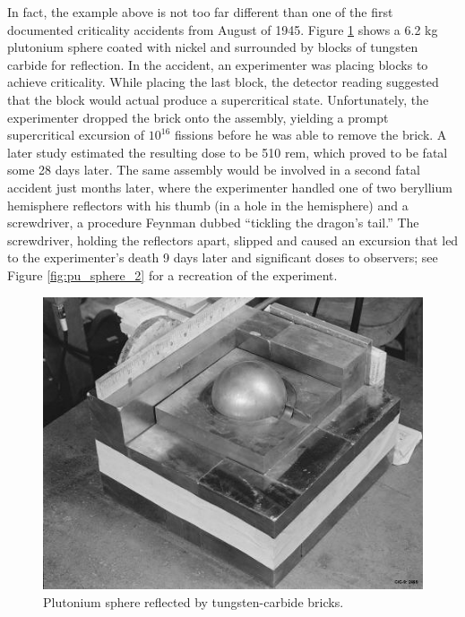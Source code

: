 In fact, the example above is not too far different than one of the first
documented criticality accidents from August of 1945.
Figure \ref{fig:pu_sphere} shows
a 6.2 kg plutonium sphere coated with nickel and surrounded by
blocks of tungsten carbide for reflection.  In the accident, an 
experimenter was placing blocks to achieve criticality.  While
placing the last block, the detector reading suggested that 
the block would actual produce a supercritical state.  Unfortunately,
the experimenter dropped the brick onto the assembly, yielding
a prompt supercritical excursion of $10^{16}$ fissions
before he was able to remove the brick.  A later study estimated
the resulting dose to be 510 rem, which proved to be fatal some
28 days later.  The same assembly would be involved in a second
fatal accident just months later, where the experimenter handled
one of two beryllium hemisphere reflectors
 with his thumb (in a hole in the 
hemisphere) and a screwdriver, a procedure Feynman dubbed
``tickling the dragon's tail.''   The screwdriver, holding the 
reflectors apart, slipped and caused an excursion that led to 
the experimenter's death 9 days later and significant doses
to observers; see Figure \ref{fig:pu_sphere_2} for a recreation
of the experiment.

\begin{figure}[ht] 
    \centering
    \includegraphics[keepaspectratio, width = 4.0 in]{images/pu_sphere}
    \caption{Plutonium sphere reflected by tungsten-carbide bricks.}
    \label{fig:pu_sphere}
\end{figure}

